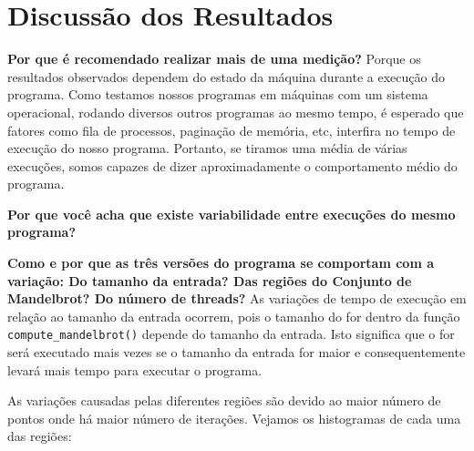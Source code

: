 \documentclass[12pt]{article}
\newcommand{\code}[1]{\texttt{#1}}
\begin{document}
\newpage
\section{Discussão dos Resultados}
{\bf Por que é recomendado realizar mais de uma medição?} 
    Porque os resultados observados dependem do estado da máquina
    durante a execução do programa. Como testamos nossos programas
    em máquinas com um sistema operacional, rodando diversos outros
    programas ao mesmo tempo, é esperado que fatores como fila de
    processos, paginação de memória, etc, interfira no tempo de 
    execução do nosso programa. Portanto, se tiramos uma média
    de várias execuções, somos capazes de dizer aproximadamente
    o comportamento médio do programa.

{\bf Por que você acha que existe variabilidade entre execuções do mesmo programa?}

{\bf Como e por que as três versões do programa se comportam com a variação: Do tamanho da entrada? Das regiões do Conjunto de Mandelbrot? Do número de threads?}
As variações de tempo de execução em relação ao tamanho da entrada ocorrem, pois o tamanho do for dentro da função \code{compute\_mandelbrot()} depende do tamanho da entrada. Isto significa que o for será executado mais vezes se o tamanho da entrada for maior e consequentemente levará mais tempo para executar o programa.

As variações causadas pelas diferentes regiões são devido ao maior número de pontos onde há maior número de iterações. Vejamos os histogramas de cada uma das regiões:
\end{document}
